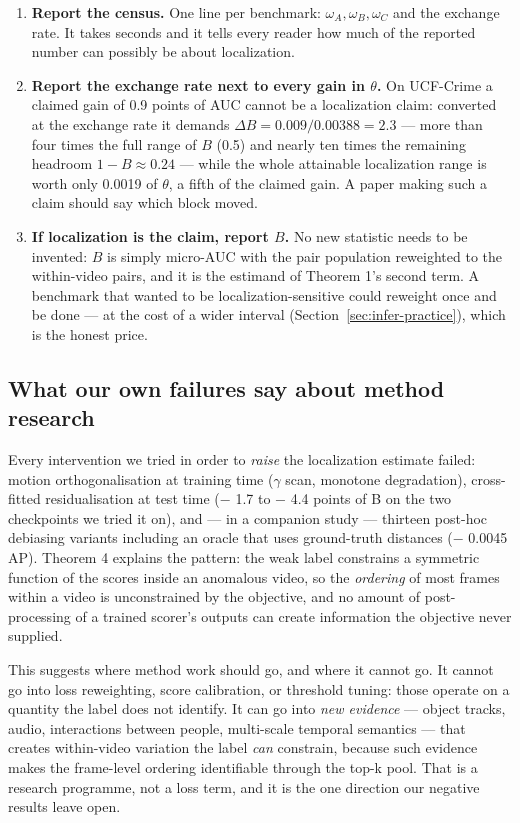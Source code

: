 \documentclass[number,preprint,12pt]{elsarticle}
\providecommand{\tightlist}{\setlength{\itemsep}{0pt}\setlength{\parskip}{0pt}}
\begin{document}
\begin{enumerate}
\def\labelenumi{\arabic{enumi}.}
\tightlist
\item
  \textbf{Report the census.} One line per benchmark: \(\omega_A,\omega_B,\omega_C\) and the
  exchange rate. It takes seconds and it tells every reader how much of the
  reported number can possibly be about localization.
\item
  \textbf{Report the exchange rate next to every gain in \(\theta\).} On UCF-Crime a
  claimed gain of 0.9 points of AUC cannot be a localization claim: converted
  at the exchange rate it demands \(\Delta B=0.009/0.00388=2.3\) --- more than
  four times the full range of \(B\) (0.5) and nearly ten times the remaining
  headroom \(1-B\approx0.24\) --- while the whole attainable localization range
  is worth only 0.0019 of \(\theta\), a fifth of the claimed gain. A paper
  making such a claim should say which block moved.
\item
  \textbf{If localization is the claim, report \(B\).} No new statistic needs to be
  invented: \(B\) is simply micro-AUC with the pair population reweighted to the
  within-video pairs, and it is the estimand of Theorem 1's second term. A
  benchmark that wanted to be localization-sensitive could reweight once and be
  done --- at the cost of a wider interval (Section~\ref{sec:infer-practice}), which is the honest price.
\end{enumerate}

\subsection{What our own failures say about method research}\label{sec:failures}

Every intervention we tried in order to \emph{raise} the localization estimate failed:
motion orthogonalisation at training time (\(\gamma\) scan, monotone degradation),
cross-fitted residualisation at test time (\(-\) 1.7 to \(-\) 4.4 points of B on the two
checkpoints we tried it on), and --- in a
companion study --- thirteen post-hoc debiasing variants including an oracle that
uses ground-truth distances (\(-\) 0.0045 AP). Theorem 4 explains the pattern: the
weak label constrains a symmetric function of the scores inside an anomalous
video, so the \emph{ordering} of most frames within a video is unconstrained by the
objective, and no amount of post-processing of a trained scorer's outputs can
create information the objective never supplied.

This suggests where method work should go, and where it cannot go. It cannot go
into loss reweighting, score calibration, or threshold tuning: those operate on
a quantity the label does not identify. It can go into \emph{new evidence} --- object
tracks, audio, interactions between people, multi-scale temporal semantics --- that
creates within-video variation the label \emph{can} constrain, because such evidence
makes the frame-level ordering identifiable through the top-k pool. That is a
research programme, not a loss term, and it is the one direction our negative
results leave open.
\end{document}
